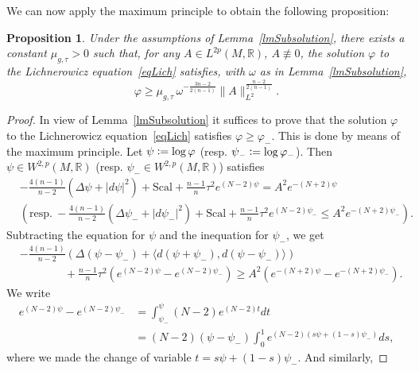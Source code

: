 \documentclass[a4paper, 10pt, reqno]{amsart}
\theoremstyle{plain}
\newtheorem{proposition}[thm]{Proposition}
\theoremstyle{remark}
\theoremstyle{definition}
\renewcommand{\phi}{\varphi}
\newcommand{\bR}{\mathbb{R}}
\newcommand{\definedas}{\mathrel{\raise.095ex\hbox{\rm :}\mkern-5.2mu=}}
\let\<\langle
\let\>\rangle
\newcommand{\scal}{\mathrm{Scal}}
\begin{document}
We can now apply the maximum principle to obtain the following proposition:

\begin{proposition}\label{propLowerBoundLich}
    Under the assumptions of Lemma~\ref{lmSubsolution}, there exists a constant
    $\mu_{g,\tau} > 0$ such that, for any $A \in L^{2p}(M, \bR)$, $A \not\equiv 0$,
    the solution $\phi$ to the Lichnerowicz equation~\eqref{eqLich} satisfies,
    with $\omega$ as in Lemma~\ref{lmSubsolution},
    \[
        \phi \geq \mu_{g,\tau}\,
        \omega^{-\frac{3n-2}{2(n-1)}} \|A\|_{L^2}^{\frac{n-2}{2(n-1)}}.
    \]
\end{proposition}

\begin{proof}
    In view of Lemma~\ref{lmSubsolution} it suffices to prove that the solution $\phi$ to the Lichnerowicz equation~\eqref{eqLich} satisfies $\phi \geq \phi_-$. This is done by means of the maximum principle. Let $\psi \definedas \log \phi$ (resp. $\psi_- \definedas \log \phi_-$). Then $\psi \in W^{2, p}(M, \bR)$ (resp. $\psi_- \in W^{2, p}(M, \bR)$) satisfies
    \begin{align*}
         & - \frac{4(n-1)}{n-2} \left(\Delta \psi + |d\psi|^2\right) + \scal + \frac{n-1}{n} \tau^2 e^{(N-2)\psi} = A^2 e^{-(N+2) \psi}                                        \\
         & \left(\text{resp.}\ - \frac{4(n-1)}{n-2} \left(\Delta \psi_- + |d\psi_-|^2\right) + \scal + \frac{n-1}{n} \tau^2 e^{(N-2)\psi_-} \leq A^2 e^{-(N+2) \psi_-}\right).
    \end{align*}
    Subtracting the equation for $\psi$ and the inequation for $\psi_-$, we get
    \begin{align*}
         & - \frac{4(n-1)}{n-2} \left(\Delta (\psi - \psi_-) + \< d(\psi+\psi_-), d(\psi-\psi_-)\>\right)                                              \\
         & \qquad\qquad + \frac{n-1}{n} \tau^2 \left(e^{(N-2)\psi} - e^{(N-2)\psi_-}\right) \geq A^2 \left(e^{-(N+2) \psi} - e^{-(N+2) \psi_-}\right).
    \end{align*}
    We write
    \begin{align*}
        e^{(N-2)\psi} - e^{(N-2)\psi_-}
         & = \int_{\psi_-}^\psi (N-2) e^{(N-2)t} dt                            \\
         & = (N-2) (\psi - \psi_-) \int_0^1 e^{(N-2)(s\psi + (1-s)\psi_-)} ds,
    \end{align*}
    where we made the change of variable $t = s \psi + (1-s) \psi_-$. And similarly,

\end{proof}
\end{document}
